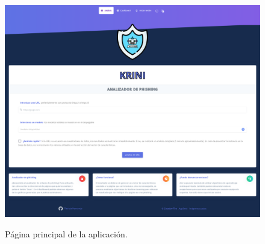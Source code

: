 \begin{figure}[h]
	\caption[Manual de usuario: página principal]{Página principal de la aplicación.}
	\centering
	\includegraphics[width=\textwidth]{../img/anexos/user_guide/1_index}
	\label{e-1:index}
\end{figure}
